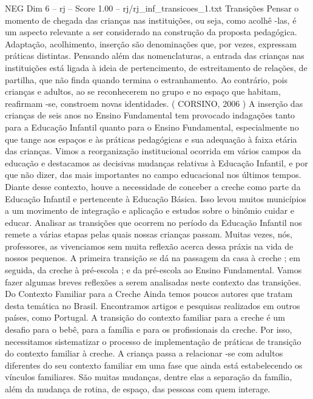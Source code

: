 \begin{textsample}{NEG Dim 6 – rj – Score 1.00 – rj/rj\_inf\_transicoes\_1.txt}  \label{ex:f6_neg_013}
Transições Pensar o momento de chegada das crianças nas instituições, ou seja, como acolhê -las, é um aspecto relevante a ser considerado na construção da proposta pedagógica.
Adaptação, acolhimento, inserção são denominações que, por vezes, expressam práticas distintas.
Pensando além das nomenclaturas, a entrada das crianças nas instituições está ligada à ideia de pertencimento, de estreitamento de relações, de partilha, que não finda quando termina o estranhamento.
Ao contrário, pois crianças e adultos, ao se reconhecerem no grupo e no espaço que habitam, reafirmam -se, constroem novas identidades. ( CORSINO, 2006 ) A inserção das crianças de seis anos no Ensino Fundamental tem provocado indagações tanto para a Educação Infantil quanto para o Ensino Fundamental, especialmente no que tange aos espaços e às práticas pedagógicas e sua adequação à faixa etária das crianças.
Vimos a reorganização institucional ocorrida em vários campos da educação e destacamos as decisivas mudanças relativas à Educação Infantil, e por que não dizer, das mais importantes no campo educacional nos últimos tempos.
Diante desse contexto, houve a necessidade de conceber a creche como parte da Educação Infantil e pertencente à Educação Básica.
Isso levou muitos municípios a um movimento de integração e aplicação e estudos sobre o binômio cuidar e educar.
Analisar as transições que ocorrem no período da Educação Infantil nos remete a várias etapas pelas quais nossas crianças passam.
Muitas vezes, nós, professores, as vivenciamos sem muita reflexão acerca dessa práxis na vida de nossos pequenos.
A primeira transição se dá na passagem da casa à creche ; em seguida, da creche à pré-escola ; e da pré-escola ao Ensino Fundamental.
Vamos fazer algumas breves reflexões a serem analisadas neste contexto das transições.
Do Contexto Familiar para a Creche Ainda temos poucos autores que tratam desta temática no Brasil.
Encontramos artigos e pesquisas realizados em outros países, como Portugal.
A transição do contexto familiar para a creche é um desafio para o bebê, para a família e para os profissionais da creche.
Por isso, necessitamos sistematizar o processo de implementação de práticas de transição do contexto familiar à creche.
A criança passa a relacionar -se com adultos diferentes do seu contexto familiar em uma fase que ainda está estabelecendo os vínculos familiares.
São muitas mudanças, dentre elas a separação da família, além da mudança de rotina, de espaço, das pessoas com quem interage.

\end{textsample}
